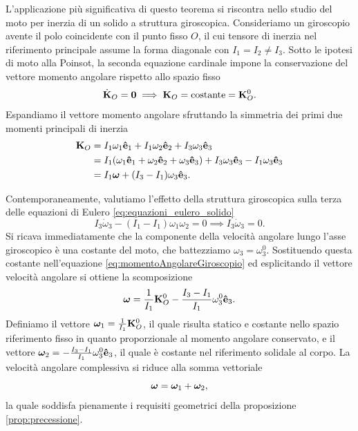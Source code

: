 L'applicazione più significativa di questo teorema si riscontra nello studio del moto per inerzia di un solido a struttura giroscopica. Consideriamo un giroscopio avente il polo coincidente con il punto fisso $O$, il cui tensore di inerzia nel riferimento principale assume la forma diagonale con $I_1 = I_2 \neq I_3$. Sotto le ipotesi di moto alla Poinsot, la seconda equazione cardinale impone la conservazione del vettore momento angolare rispetto allo spazio fisso
\begin{equation*}
    \dot{\vb{K}}_O = \vb{0} \implies \vb{K}_O = \text{costante} = \vb{K}_O^0.
\end{equation*}
Espandiamo il vettore momento angolare sfruttando la simmetria dei primi due momenti principali di inerzia
\begin{align}
    \vb{K}_O &= I_1 \omega_1 \vu{e}_1 + I_1 \omega_2 \vu{e}_2 + I_3 \omega_3 \vu{e}_3 \nonumber \\
    &= I_1 \qty(\omega_1 \vu{e}_1 + \omega_2 \vu{e}_2 + \omega_3 \vu{e}_3) + I_3 \omega_3 \vu{e}_3 - I_1 \omega_3 \vu{e}_3 \nonumber \\
    &= I_1 \vb*{\omega} + (I_3 - I_1) \omega_3 \vu{e}_3. \label{eq:momentoAngolareGiroscopio}
\end{align}

Contemporaneamente, valutiamo l'effetto della struttura giroscopica sulla terza delle equazioni di Eulero \eqref{eq:equazioni_eulero_solido}
\begin{equation*}
    I_3 \dot{\omega}_3 - (I_1 - I_1) \omega_1 \omega_2 = 0 \implies I_3 \dot{\omega}_3 = 0.
\end{equation*}
Si ricava immediatamente che la componente della velocità angolare lungo l'asse giroscopico è una costante del moto, che battezziamo $\omega_3 = \omega_3^0$. Sostituendo questa costante nell'equazione \eqref{eq:momentoAngolareGiroscopio} ed esplicitando il vettore velocità angolare si ottiene la scomposizione
\begin{equation*}
    \vb*{\omega} = \frac{1}{I_1} \vb{K}_O^0 - \frac{I_3 - I_1}{I_1} \omega_3^0 \vu{e}_3.
\end{equation*}
Definiamo il vettore $\vb*{\omega}_1 = \frac{1}{I_1} \vb{K}_O^0$, il quale risulta statico e costante nello spazio riferimento fisso in quanto proporzionale al momento angolare conservato, e il vettore $\vb*{\omega}_2 = - \frac{I_3 - I_1}{I_1} \omega_3^0 \vu{e}_3$, il quale è costante nel riferimento solidale al corpo. La velocità angolare complessiva si riduce alla somma vettoriale
\begin{equation*}
    \vb*{\omega} = \vb*{\omega}_1 + \vb*{\omega}_2,
\end{equation*}
la quale soddisfa pienamente i requisiti geometrici della proposizione \ref{prop:precessione}. 

